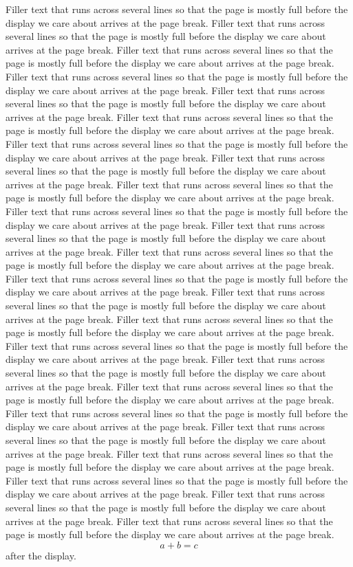 \documentclass[10pt]{article}
\begin{document}
Filler text that runs across several lines so that the page is mostly full before the display we care about arrives at the page break. Filler text that runs across several lines so that the page is mostly full before the display we care about arrives at the page break. Filler text that runs across several lines so that the page is mostly full before the display we care about arrives at the page break. Filler text that runs across several lines so that the page is mostly full before the display we care about arrives at the page break. Filler text that runs across several lines so that the page is mostly full before the display we care about arrives at the page break. Filler text that runs across several lines so that the page is mostly full before the display we care about arrives at the page break. Filler text that runs across several lines so that the page is mostly full before the display we care about arrives at the page break. Filler text that runs across several lines so that the page is mostly full before the display we care about arrives at the page break. Filler text that runs across several lines so that the page is mostly full before the display we care about arrives at the page break. Filler text that runs across several lines so that the page is mostly full before the display we care about arrives at the page break. Filler text that runs across several lines so that the page is mostly full before the display we care about arrives at the page break. Filler text that runs across several lines so that the page is mostly full before the display we care about arrives at the page break. Filler text that runs across several lines so that the page is mostly full before the display we care about arrives at the page break. Filler text that runs across several lines so that the page is mostly full before the display we care about arrives at the page break. Filler text that runs across several lines so that the page is mostly full before the display we care about arrives at the page break. Filler text that runs across several lines so that the page is mostly full before the display we care about arrives at the page break. Filler text that runs across several lines so that the page is mostly full before the display we care about arrives at the page break. Filler text that runs across several lines so that the page is mostly full before the display we care about arrives at the page break. Filler text that runs across several lines so that the page is mostly full before the display we care about arrives at the page break. Filler text that runs across several lines so that the page is mostly full before the display we care about arrives at the page break. Filler text that runs across several lines so that the page is mostly full before the display we care about arrives at the page break. Filler text that runs across several lines so that the page is mostly full before the display we care about arrives at the page break. Filler text that runs across several lines so that the page is mostly full before the display we care about arrives at the page break. Filler text that runs across several lines so that the page is mostly full before the display we care about arrives at the page break. 
\[ a + b = c \]
after the display.
\end{document}
